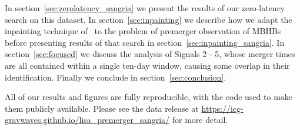 In section~\ref{sec:zerolatency_sangria} we present the results of our zero-latency search on this dataset.
In section~\ref{sec:inpainting} we describe how we adapt the inpainting technique of~\cite{Zackay:2019kkv} to the problem of premerger observation of \acp{MBHB} before presenting results of that search in section~\ref{sec:inpainting_sangria}.
In section~\ref{sec:focused} we discuss the analysis of Signals 2 - 5, whose merger times are all contained within a single ten-day window, causing some overlap in their identification.
Finally we conclude in section~\ref{sec:conclusion}.

All of our results and figures are fully reproducible, with the code
used to make them publicly available. Please see the data release at
\url{https://icg-gravwaves.github.io/lisa_premerger_sangria/}
for more detail.
